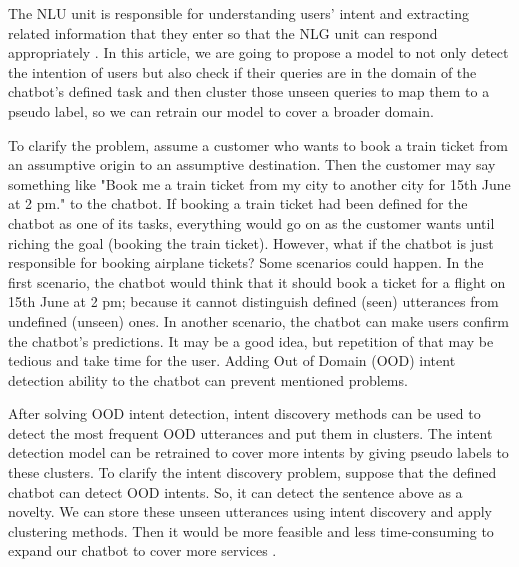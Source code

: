\documentclass{article}
\begin{document}
The NLU unit is responsible for understanding users’ intent and extracting
related information that they enter so that the NLG unit can respond appropriately \citep{gupta2019casa}.
In this article, we are going to propose a model to not only detect the intention
of users but also check if their queries are in the domain of the chatbot’s
defined task and then cluster those unseen queries to map them to a pseudo label,
so we can retrain our model to cover a broader domain.

To clarify the problem, assume a customer who wants to book a train ticket from an assumptive origin to an assumptive destination. 
Then the customer may say something like "Book me a train ticket from my city to another city for 15th June at 2 pm." to the chatbot. 
If booking a train ticket had been defined for the chatbot as one of its tasks, everything
would go on as the customer wants until riching the goal (booking the
train ticket). However, what if the chatbot is just responsible for booking
airplane tickets? Some scenarios could happen. In the first scenario,
the chatbot would think that it should book a ticket for a flight
on 15th June at 2 pm; because it cannot distinguish defined (seen)
utterances from undefined (unseen) ones. In another scenario, the
chatbot can make users confirm the chatbot's predictions. It may
be a good idea, but repetition of that may be tedious and take time
for the user. Adding Out of Domain (OOD) intent detection
ability to the chatbot can prevent mentioned problems.

After solving OOD intent detection, intent discovery methods
can be used to detect the most frequent OOD utterances and put
them in clusters. The intent detection model can be retrained to
cover more intents by giving pseudo labels to these clusters. To
clarify the intent discovery problem, suppose that the defined
chatbot can detect OOD intents. So, it can detect the sentence above
as a novelty. We can store these unseen utterances using intent discovery and apply clustering methods. Then it would be
more feasible and less time-consuming to expand our chatbot to
cover more services \citep{congying2018zero}.
\end{document}
